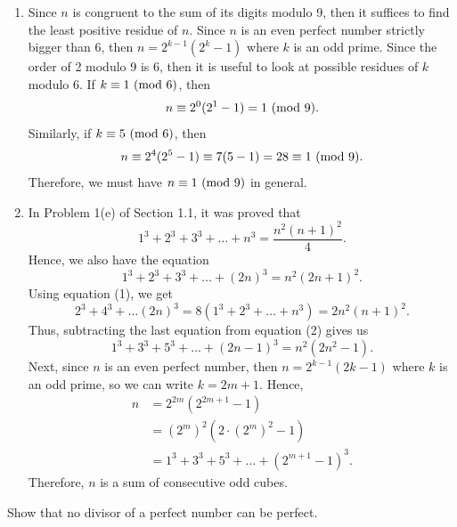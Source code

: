\begin{solution}
    \begin{enumerate}
        \item Since $n$ is congruent to the sum of its digits modulo 9, then it suffices to find the least positive residue of $n$. Since $n$ is an even perfect number strictly bigger than 6, then $n = 2^{k-1}(2^k - 1)$ where $k$ is an odd prime. Since the order of 2 modulo 9 is 6, then it is useful to look at possible residues of $k$ modulo 6. If $k \equiv 1 \ (\mathrm{mod}\ 6)$, then
        $$n \equiv 2^{0}(2^1 - 1) = 1 \ (\mathrm{mod}\ 9).$$
        Similarly, if $k \equiv 5 \ (\mathrm{mod}\ 6)$, then
        $$n \equiv 2^4(2^5 - 1) \equiv 7(5 - 1) = 28 \equiv 1 \ (\mathrm{mod}\ 9).$$
        Therefore, we must have $n \equiv 1 \ (\mathrm{mod}\ 9)$ in general.
        \item In Problem 1(e) of Section 1.1, it was proved that
        \begin{equation}
            1^3 + 2^3 + 3^3 + \dots + n^3 = \frac{n^2(n+1)^2}{4}. \tag{1}
        \end{equation}
        Hence, we also have the equation
        \begin{equation}
            1^3 + 2^3 + 3^3 + \dots + (2n)^3 = n^2(2n + 1)^2. \tag{2}
        \end{equation}
        Using equation (1), we get
        $$2^3 + 4^3 + \dots (2n)^3 = 8(1^3 + 2^3 + \dots + n^3) = 2n^2(n+1)^2.$$
        Thus, subtracting the last equation from equation (2) gives us
        \begin{equation}
            1^3 + 3^3 + 5^3 + \dots + (2n-1)^3 = n^2(2n^2 - 1). \tag{3}
        \end{equation}
        Next, since $n$ is an even perfect number, then $n = 2^{k-1}(2k - 1)$ where $k$ is an odd prime, so we can write $k = 2m + 1$. Hence, 
        \begin{align*}
            n &= 2^{2m}(2^{2m+1} - 1) \\
            &= (2^m)^2(2\cdot (2^m)^2 - 1) \\
            &= 1^3 + 3^3 + 5^3 + \dots + (2^{m+1}-1)^3.
        \end{align*}
        Therefore, $n$ is a sum of consecutive odd cubes.\\
    \end{enumerate}
\end{solution}

\begin{exercise}
    Show that no divisor of a perfect number can be perfect.  \\
\end{exercise}

